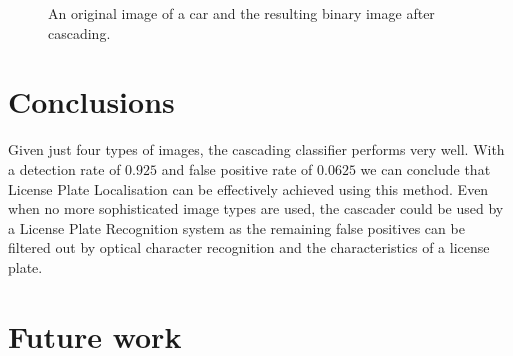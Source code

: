 \documentclass[a4paper,11pt]{article}
\begin{document}
\begin{figure}[!ht]
\centering
{}
\caption{An original image of a car and the resulting binary image after cascading.}
\label{fig:result}
\end{figure}

\section{Conclusions} \label{sec:conc}
Given just four types of images, the cascading classifier performs very well.
With a detection rate of $0.925$ and false positive rate of $0.0625$ we can
conclude that License Plate Localisation can be effectively achieved using this
method. Even when no more sophisticated image types are used, the cascader
could be used by a License Plate Recognition system as the remaining false
positives can be filtered out by optical character recognition and the
characteristics of a license plate.

\section{Future work} \label{sec:conc}
\end{document}
